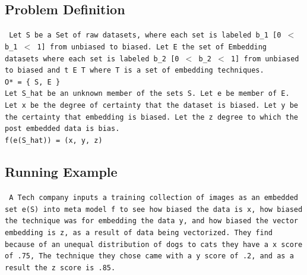 \documentclass[sigconf]{acmart}
\begin{document}
\subsection{Problem Definition}
\noindent\texttt{\small
Let S be a Set of raw datasets, where each set is labeled b\_1 [0 $<$ b\_1 $<$ 1] from unbiased to biased. Let E the set of Embedding datasets where each set is labeled b\_2 [0 $<$ b\_2 $<$ 1] from unbiased to biased and t E T where T is a set of embedding techniques.\\
O* = \{ S, E \}\\
Let S\_hat be an unknown member of the sets S. Let e be member of E. Let x be the degree of certainty that the dataset is biased. Let y be the certainty that embedding is biased. Let the z degree to which the post embedded data is bias.\\
f(e(S\_hat)) = (x, y, z)}

\subsection{Running Example}
\noindent\texttt{\small
A Tech company inputs a training collection of images as an embedded set e(S) into meta model f to see how biased the data is x, how biased the technique was for embedding the data y, and how biased the vector embedding is z, as a result of data being vectorized. They find because of an unequal distribution of dogs to cats they have a x score of .75, The technique they chose came with a y score of .2, and as a result the z score is .85.}
\end{document}
